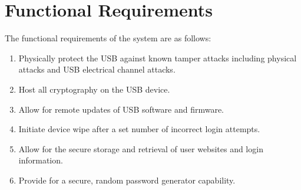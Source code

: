 \section{Functional Requirements}
\label{sec:funcreq}
The functional requirements of the system are as follows:
\begin{enumerate}
    \item{Physically protect the USB against known tamper attacks including
physical attacks and USB electrical channel attacks.}
    \item{Host all cryptography on the USB device.}
    \item{Allow for remote updates of USB software and firmware.}
    \item{Initiate device wipe after a set number of incorrect login attempts.}
    \item{Allow for the secure storage and retrieval of user websites and login
information.}
    \item{Provide for a secure, random password generator capability.}
\end{enumerate}
